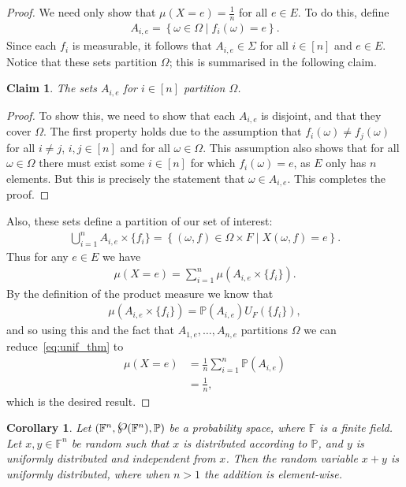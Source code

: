\documentclass{article}
\newcommand{\powerset}{\raisebox{.15\baselineskip}{\Large\ensuremath{\wp}}}
\newcommand{\set}[2]{\left\{ #1 \middle| #2 \right\}}
\newcommand{\seq}[1]{\left[#1\right]}
\newtheorem{corollary}{Corollary}
\newtheorem{claim}{Claim}
\theoremstyle{remark}
\newcommand{\F}{\mathbb{F}}
\renewcommand{\P}{\mathbb{P}}
\begin{document}
\begin{proof}
	We need only show that $\mu(X = e) = \frac{1}{n}$ for all $e \in E$. To do
	this, define
	\begin{align*}
		A_{i,e} = \set{\omega \in \Omega}{f_i(\omega) = e}.
	\end{align*}
	Since each $f_i$ is measurable, it follows that $A_{i,e} \in \Sigma$ for
	all $i \in \seq{n}$ and $e \in E$. Notice that these sets partition
	$\Omega$; this is summarised in the following claim.
	\begin{claim}
		The sets $A_{i,e}$ for $i \in \seq{n}$ partition $\Omega$.
	\end{claim}
	\begin{proof}
		To show this, we need to show that each $A_{i,e}$ is disjoint, and that
		they cover $\Omega$. The first property holds due to the assumption
		that $f_i(\omega) \ne f_j(\omega)$ for all $i \ne j$, $i, j \in
		\seq{n}$ and for all $\omega \in \Omega$. This assumption also shows
		that for all $\omega \in \Omega$ there must exist some $i \in \seq{n}$
		for which $f_i(\omega) = e$, as $E$ only has $n$ elements. But this is
		precisely the statement that $\omega \in A_{i,e}$. This completes the
		proof.
	\end{proof}
	Also, these sets define a partition of our set of interest:
	\begin{align*}
		\bigcup_{i=1}^n A_{i,e} \times \{f_i\}
		= \set{(\omega, f) \in \Omega \times F}{X(\omega, f) = e}.
	\end{align*}
	Thus for any $e \in E$ we have
	\begin{align}
		\label{eq:unif_thm}\mu(X = e) =
		\sum_{i=1}^n \mu\left(A_{i,e} \times \{f_i\}\right).
	\end{align}
	By the definition of the product measure we know that
	\begin{align*}
		\mu(A_{i,e} \times \{f_i\}) = \P(A_{i,e})U_F(\{f_i\}),
	\end{align*}
	and so using this and the fact that $A_{1,e}, \ldots, A_{n,e}$ partitions
	$\Omega$ we can reduce~\eqref{eq:unif_thm} to
	\begin{align*}
		\mu(X = e) &= \frac{1}{n}\sum_{i=1}^n \P(A_{i,e})\\
		&= \frac{1}{n},
	\end{align*}
	which is the desired result.
\end{proof}

\begin{corollary}\label{cor:unif}
	Let $(\F^n, \powerset(\F^n), \P)$ be a probability space, where $\F$ is a
	finite field. Let $x, y \in \F^n$ be random such that $x$ is distributed
	according to $\P$, and $y$ is uniformly distributed and independent from
	$x$. Then the random variable $x + y$ is uniformly distributed, where when
	$n > 1$ the addition is element-wise.
\end{corollary}
\end{document}
